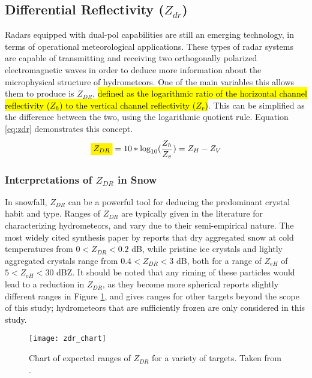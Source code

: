 \subsection{Differential Reflectivity ($Z_{dr}$)}
Radars equipped with dual-pol capabilities are still an emerging technology, in terms of operational meteorological applications. These
types of radar systems are capable of transmitting and receiving two orthogonally polarized electromagnetic waves in order to deduce more information about
the microphysical structure of hydrometeors. One of the main variables this allows them to produce is $Z_{DR}$, \hl{defined as the logarithmic ratio of the 
horizontal channel reflectivity ($Z_h$) to the vertical channel reflectivity ($Z_{v}$)}. This can be simplified as the difference between the two, using the
logarithmic quotient rule. Equation \ref{eq:zdr} demonstrates this concept.
\begin{equation}\label{eq:zdr}
\mathcolorbox{yellow}{Z_{DR}} = 10 * \log_{10}(\frac{Z_h}{Z_v}) = Z_H - Z_V
\end{equation}
\subsubsection{Interpretations of $Z_{DR}$ in Snow}
In snowfall, $Z_{DR}$ can be a powerful tool for deducing the predominant crystal habit and type. Ranges of $Z_{DR}$ are typically given in the literature for characterizing hydrometeors, and vary due to their semi-empirical nature. The most widely cited synthesis paper by \citet{Straka2000} reports that dry aggregated snow at cold temperatures from $0 < Z_{DR} < 0.2$ dB, while pristine ice crystals and lightly aggregated crystals range from $0.4 < Z_{DR} < 3$ dB, both for a range of $Z_{eH}$ of $5 < Z_{eH} < 30$ dBZ. It should be noted that any riming of these particles would lead to a reduction in $Z_{DR}$, as they become more spherical \citet{Fabry2015} reports slightly different ranges in Figure \ref{zdr_chart}, and gives ranges for other targets beyond the scope of this study; hydrometeors that are sufficiently frozen are only considered in this study.
\begin{figure}[H]
\texttt{[image: zdr\_chart]}
\caption{Chart of expected ranges of $Z_{DR}$ for a variety of targets. Taken from \citet{Fabry2015}.} 
\label{zdr_chart}
\end{figure}
